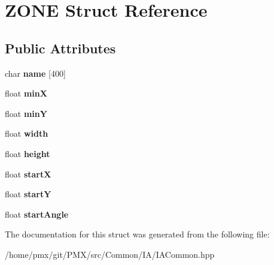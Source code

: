 \hypertarget{structZONE}{}\section{Z\+O\+NE Struct Reference}
\label{structZONE}
\subsection*{Public Attributes}
\begin{DoxyCompactItemize}
\item 
\mbox{\label{structZONE_a818067a3e7c78d672e2cfa683f96ba7a}} 
char {\bfseries name} \mbox{[}400\mbox{]}
\item 
\mbox{\label{structZONE_a8aa5b493c172b74830c78fcb34a0423e}} 
float {\bfseries minX}
\item 
\mbox{\label{structZONE_a330f2b24e70f991b048f761f2466f42a}} 
float {\bfseries minY}
\item 
\mbox{\label{structZONE_abf69544132efea324bb72dbeede3a7d4}} 
float {\bfseries width}
\item 
\mbox{\label{structZONE_afc24ab7d122a986ca1e0518c8de5dd6e}} 
float {\bfseries height}
\item 
\mbox{\label{structZONE_a3d12eb3a0c330bf23df8e2f0bd161e8c}} 
float {\bfseries startX}
\item 
\mbox{\label{structZONE_aa000f1f02d6cf2106b90fb3fb96253cc}} 
float {\bfseries startY}
\item 
\mbox{\label{structZONE_a88fcb5ae1ed363ee932de3a972f94632}} 
float {\bfseries start\+Angle}
\end{DoxyCompactItemize}


The documentation for this struct was generated from the following file\+:\begin{DoxyCompactItemize}
\item 
/home/pmx/git/\+P\+M\+X/src/\+Common/\+I\+A/I\+A\+Common.\+hpp\end{DoxyCompactItemize}
